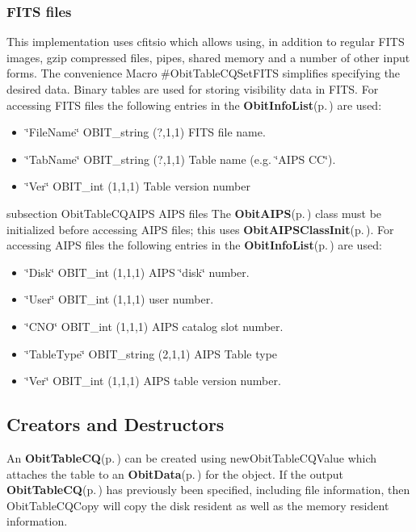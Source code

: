 \subsubsection{FITS files}\label{ObitTableWX_8h_TableFITS}
This implementation uses cfitsio which allows using, in addition to regular FITS images, gzip compressed files, pipes, shared memory and a number of other input forms. The convenience Macro \#Obit\-Table\-CQSet\-FITS simplifies specifying the desired data. Binary tables are used for storing visibility data in FITS. For accessing FITS files the following entries in the {\bf Obit\-Info\-List}{\rm (p.\,\pageref{structObitInfoList})} are used: \begin{itemize}
\item \char`\"{}File\-Name\char`\"{} OBIT\_\-string (?,1,1) FITS file name. \item \char`\"{}Tab\-Name\char`\"{} OBIT\_\-string (?,1,1) Table name (e.g. \char`\"{}AIPS CC\char`\"{}). \item \char`\"{}Ver\char`\"{} OBIT\_\-int (1,1,1) Table version number\end{itemize}
subsection Obit\-Table\-CQAIPS AIPS files The {\bf Obit\-AIPS}{\rm (p.\,\pageref{structObitAIPS})} class must be initialized before accessing AIPS files; this uses {\bf Obit\-AIPSClass\-Init}{\rm (p.\,\pageref{ObitAIPS_8c_a5})}. For accessing AIPS files the following entries in the {\bf Obit\-Info\-List}{\rm (p.\,\pageref{structObitInfoList})} are used: \begin{itemize}
\item \char`\"{}Disk\char`\"{} OBIT\_\-int (1,1,1) AIPS \char`\"{}disk\char`\"{} number. \item \char`\"{}User\char`\"{} OBIT\_\-int (1,1,1) user number. \item \char`\"{}CNO\char`\"{} OBIT\_\-int (1,1,1) AIPS catalog slot number. \item \char`\"{}Table\-Type\char`\"{} OBIT\_\-string (2,1,1) AIPS Table type \item \char`\"{}Ver\char`\"{} OBIT\_\-int (1,1,1) AIPS table version number.\end{itemize}
\subsection{Creators and Destructors}\label{ObitTableCQ_8h_ObitTableCQaccess}
An {\bf Obit\-Table\-CQ}{\rm (p.\,\pageref{structObitTableCQ})} can be created using new\-Obit\-Table\-CQValue which attaches the table to an {\bf Obit\-Data}{\rm (p.\,\pageref{structObitData})} for the object. If the output {\bf Obit\-Table\-CQ}{\rm (p.\,\pageref{structObitTableCQ})} has previously been specified, including file information, then Obit\-Table\-CQCopy will copy the disk resident as well as the memory resident information.

